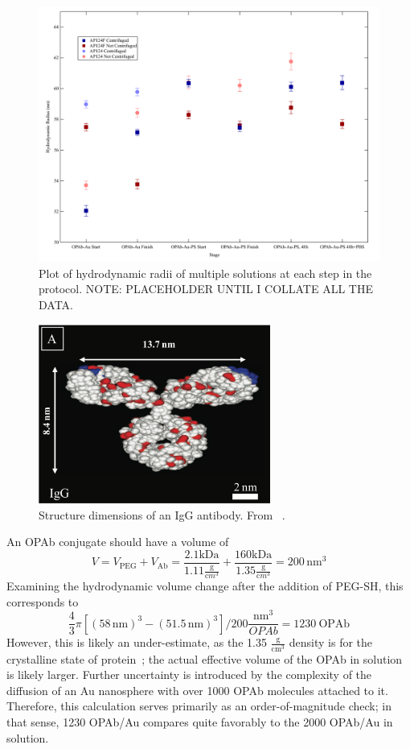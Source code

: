 \begin{figure}[htbp]
\centering
\includegraphics[keepaspectratio,width=\textwidth,height=0.75\textheight]{2011DecPEGylation.pdf}
\caption{Plot of hydrodynamic radii of multiple solutions at each step in the protocol. NOTE: PLACEHOLDER UNTIL I COLLATE ALL THE DATA.}
\label{fullprotocol}
\end{figure}



\begin{figure}[htbp]
\centering
\includegraphics[keepaspectratio,width=3in,height=0.75\textheight]{iggstructure.pdf}
\caption{Structure dimensions of an IgG antibody. From ~\citep{antibodylength}.}
\label{iggstructure}
\end{figure}




An OPAb conjugate should have a volume of
\[V=V_{\mathrm{PEG}}+V_{\mathrm{Ab}}=\frac{2.1\mathrm{kDa}}{1.11\frac{\mathrm g}{\mathrm cm^3}}+\frac{160\mathrm{kDa}}{1.35\frac{\mathrm g}{\mathrm cm^3}}=200\,\mathrm{nm}^3\]
Examining the hydrodynamic volume change after the addition of PEG-SH, this corresponds to
\[\frac{4}{3}\pi[(58\mathrm{\,nm})^3-(51.5\mathrm{\,nm})^3]/200\frac{\mathrm{nm}^3}{OPAb}=1230\mathrm{\ OPAb}\]
However, this is likely an under-estimate, as the 1.35 $\mathrm{\frac{g}{cm^3}}$ density is for the crystalline state of protein~\citep{proteindensity}; the actual effective volume of the OPAb in solution is likely larger. Further uncertainty is introduced by the complexity of the diffusion of an Au nanosphere with over 1000 OPAb molecules attached to it. Therefore, this calculation serves primarily as an order-of-magnitude check; in that sense, 1230 OPAb\slash Au compares quite favorably to the 2000 OPAb\slash Au in solution.


